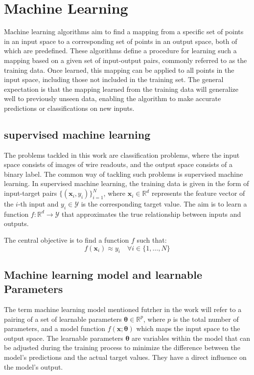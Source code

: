 \documentclass{pracalicmgr}
\begin{document}
\section{Machine Learning}

Machine learning algorithms aim to find a mapping from a specific set of points in an input space to a corresponding set of points in an output space, both of which are predefined. These algorithms define a procedure for learning such a mapping based on a given set of input-output pairs, commonly referred to as the training data. Once learned, this mapping can be applied to all points in the input space, including those not included in the training set. The general expectation is that the mapping learned from the training data will generalize well to previously unseen data, enabling the algorithm to make accurate predictions or classifications on new inputs.

\subsection{supervised machine learning}

The problems tackled in this work are classification problems, where the input space consists of images of wire readouts, and the output space consists of a binary label. The common way of tackling such problems is supervised machine learning.
In supervised machine learning, the training data is given in the form of input-target pairs \( \{(\mathbf{x}_i, y_i)\}_{i=1}^N \), where \( \mathbf{x}_i \in \mathbb{R}^d \) represents the feature vector of the \( i \)-th input and \( y_i \in \mathcal{Y} \) is the corresponding target value. The aim is to learn a function \( f: \mathbb{R}^d \rightarrow \mathcal{Y} \) that approximates the true relationship between inputs and outputs.

The central objective is to find a function \( f \) such that:
\[
f(\mathbf{x}_i) \approx y_i \quad \forall i \in \{1, \dots, N\}
\]

\subsection{Machine learning model and learnable Parameters}

The term machine learning model mentioned futrher in the work will refer to a pairing of a set of learnable parameters \( \boldsymbol{\theta} \in \mathbb{R}^p \), where \( p \) is the total number of parameters, and a model function \( f(\mathbf{x}; \boldsymbol{\theta}) \) which maps the input space to the output space. The learnable parameters \( \boldsymbol{\theta} \) are variables within the model that can be adjusted during the training process to minimize the difference between the model's predictions and the actual target values. They have a direct influence on the model's output.
\end{document}
